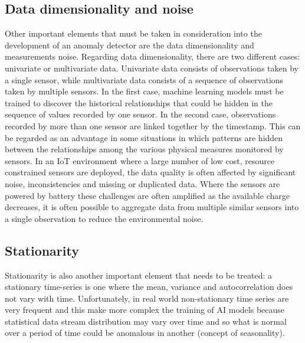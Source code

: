 \subsection{Data dimensionality and noise}
Other important elements that must be taken in consideration into the development of an anomaly detector are the data dimensionality and measurements noise. Regarding data dimensionality, there are two different cases: univariate or multivariate data. Univariate data consists of observations taken by a single sensor, while multivariate data consists of a sequence of observations taken by multiple sensors. In the first case, machine learning models must be trained to discover the historical relationships that could be hidden in the sequence of values recorded by one sensor. In the second case, observations recorded by more than one sensor are linked together by the timestamp. This can be regarded as an advantage in some situations in which patterns are hidden between the relationships among the various physical measures monitored by sensors. In an IoT environment where a large number of low cost, resource constrained sensors are deployed, the data quality is often affected by significant noise, inconsistencies and missing or duplicated data. Where the sensors are powered by battery these challenges are often amplified as the available charge decreases, it is often possible to aggregate data from multiple similar sensors into a single observation to reduce the environmental noise.
\subsection{Stationarity}
Stationarity is also another important element that needs to be treated: a stationary time-series is one where the mean, variance and autocorrelation does not vary with time. Unfortunately, in real world non-stationary time series are very frequent and this make more complex the training of AI models because statistical data stream distribution may vary over time and so what is normal over a period of time could be anomalous in another (concept of seasonality).
